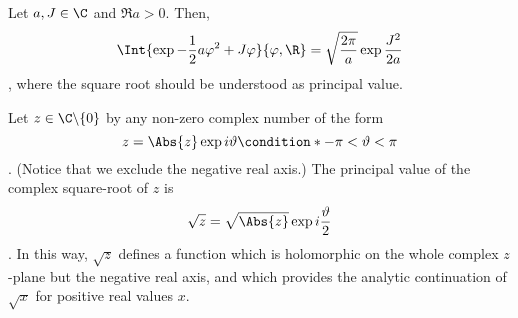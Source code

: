 \begin{theorem}
   Let  $a,J\in\C$ and $\Re a> 0$.
   Then, 
   \begin{dmath}
      \Int{ \exp{ -\frac{1}{2} a \varphi^{2} + J\varphi}}{\varphi, \R} =
      \sqrt{\frac{2\pi}{a}} \exp{\frac{J^{2}}{2a}}
   \end{dmath},
   where the square root should be understood as principal value.
\end{theorem}
   \begin{remark}
      Let  $z\in\C\backslash\lbrace0\rbrace$ by any non-zero complex
      number of the form 
      \begin{dmath*}
	 z=\Abs{z} \exp{i\vartheta} \condition*{-\pi < \vartheta < \pi}
      \end{dmath*}.
      (Notice that we exclude the negative real axis.)
      The principal value of the complex square-root of $z$ is 
      \begin{dmath*}
	 \sqrt{z} = \sqrt{\Abs{z}} \exp{i \frac{\vartheta}{2}}
      \end{dmath*}.
      In this way, $\sqrt{z}$ defines a function which is holomorphic on the
      whole complex $z$-plane but the negative real axis, and which provides
      the analytic continuation of $\sqrt{x}$ for positive real values $x$.
   \end{remark}

